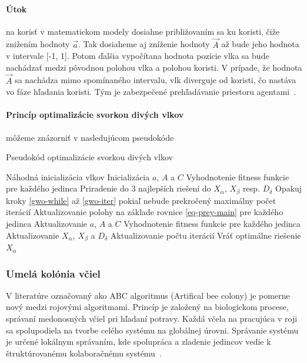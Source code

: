 \documentclass[a4paper,slovak,12pt,appendix]{article}
\begin{document}
\paragraph{Útok} na korisť v matematickom modely dosiahne približovaním sa ku
koristi, čiže znižením hodnoty $\vec{a}$. Tak dosiaheme aj zníženie hodnoty
$\vec{A}$ až bude jeho hodnota v intervale [-1, 1]. Potom ďalšia vypočítana
hodnota pozície vlka sa bude nachádzať medzi pôvodnou polohou vlka
a polohou koristi. V prípade, že hodnota $\vec{A}$ sa nachádza mimo spomínaného
intervalu, vlk diverguje od koristi, čo nastáva vo fáze hľadania koristi. Tým
je zabezpečené prehľadávanie priestoru agentami~\cite{Seeley1991}.

\paragraph{Princíp optimalizácie svorkou divých vlkov} môžeme znázorniť
v nasledujúcom pseudokóde~\cite{Seeley1991}
\begin{algorithm}[H]
  \caption{Pseudokód optimalizácie svorkou divých vlkov}
  \begin{algorithmic}[1]
    \State Náhodná inicializácia vlkov
    \State Inicializácia $a$, $A$ a $C$
    \State Vyhodnotenie fitness funkcie pre každého jedinca
    \State Priradenie do 3 najlepších riešení do $X_\alpha$, $X_\beta$ resp. $D_\delta$
    \State Opakuj kroky \ref{gwo-while} až \ref{gwo-iter} pokiaľ nebude prekročený maximálny počet iterácií \label{gwo-while}
    \State Aktualizovanie polohy na základe rovnice \ref{eq-prey-main} pre každého jedinca
    \State Aktualizovanie $a$, $A$ a $C$
    \State Vyhodnotenie fitness funkcie pre každého jedinca
    \State Aktualizovanie $X_\alpha$, $X_\beta$ a $D_\delta$
    \State Aktualizovanie počtu iterácií \label{gwo-iter}
    \State Vráť optimálne riešenie $X_\alpha$
  \end{algorithmic}
\end{algorithm}


\subsubsection{Umelá kolónia včiel}
V literatúre označovaný ako ABC algoritmus (Artifical bee colony) je pomerne
nový medzi rojovými algoritmami. Princíp je založený na biologickom procese,
správaní medonosných včiel pri hľadaní potravy. Každá včela na pracujúca
v roji sa spolupodiela na tvorbe celého systému na globálnej úrovni. Správanie
systému je určené lokálnym správaním, kde spolupráca a zladenie jedincov vedie
k štruktúrovanému kolaboračnému systému~\cite{Chavan2015}.
\end{document}
